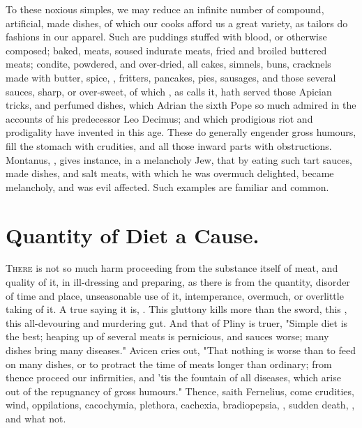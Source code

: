 To these noxious simples, we may reduce an infinite number of compound,
artificial, made dishes, of which our cooks afford us a great variety, as
tailors do fashions in our apparel. Such are puddings
stuffed with blood, or otherwise composed; baked, meats, soused indurate meats,
fried and broiled buttered meats; condite, powdered, and over-dried,
all cakes, simnels, buns, cracknels made with butter,
spice, \etc{}, fritters, pancakes, pies, sausages, and those several sauces,
sharp, or over-sweet, of which , as \Seneca{} calls it, hath
served those Apician tricks, and perfumed dishes, which
Adrian the sixth Pope so much admired in the accounts of his predecessor Leo
Decimus; and which prodigious riot and prodigality have invented in this age.
These do generally engender gross humours, fill the stomach with crudities, and
all those inward parts with obstructions. Montanus,
, gives instance, in a melancholy Jew, that by
eating such tart sauces, made dishes, and salt meats, with which he was
overmuch delighted, became melancholy, and was evil affected. Such examples are
familiar and common.

\section{Quantity of Diet a Cause.}

\lettrine{T}{here} is not so much harm proceeding from the substance itself of
meat, and quality of it, in ill-dressing and preparing, as there is from the
quantity, disorder of time and place, unseasonable use of it,
intemperance, overmuch, or overlittle taking of it. A true
saying it is, . This gluttony kills more than
the sword, this , this all-devouring and
murdering gut. And that of Pliny is truer, "Simple diet is
the best; heaping up of several meats is pernicious, and sauces worse; many
dishes bring many diseases." Avicen cries out, "That
nothing is worse than to feed on many dishes, or to protract the time of meats
longer than ordinary; from thence proceed our infirmities, and 'tis the
fountain of all diseases, which arise out of the repugnancy of gross humours."
Thence, saith Fernelius, come crudities, wind,
oppilations, cacochymia, plethora, cachexia, bradiopepsia,
,
sudden death, \etc{}, and what not.

